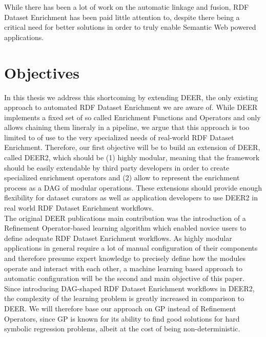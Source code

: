 While there has been a lot of work on the automatic linkage and fusion, \ac{RDF} Dataset Enrichment has been paid little attention to, despite there being a critical need for better solutions in order to truly enable  Semantic Web powered applications.

\section{Objectives}
\label{sec:objectives}
In this thesis we address this shortcoming by extending \ac{DEER}\cite{sherif:2015a}, the only existing approach to automated \ac{RDF} Dataset Enrichment we are aware of.
While DEER implements a fixed set of so called Enrichment Functions and Operators and only allows chaining them lineraly in a pipeline, we argue that this approach is too limited to of use to the very specialized needs of real-world \ac{RDF} Dataset Enrichment.
Therefore, our first objective will be to build an extension of \ac{DEER}, called \ac{DEER2}, which should be (1) highly modular, meaning that the framework should be easily extendable by third party developers in order to create specialized enrichment operators and (2) allow to represent the enrichment process as a \ac{DAG} of modular operations.
These extensions should provide enough flexibility for dataset curators as well as application developers to use \ac{DEER2} in real world \ac{RDF} Dataset Enrichment workflows.\\

The original \ac{DEER} publications main contribution was the introduction of a Refinement Operator-based learning algorithm which enabled novice users to define adequate \ac{RDF} Dataset Enrichment workflows.
As highly modular applications in general require a lot of manual configuration of their components and therefore presume expert knowledge to precisely define how the modules operate and interact with each other, a machine learning based approach to automatic configuration will be the second and main objective of this paper.\\

Since introducing \ac{DAG}-shaped \ac{RDF} Dataset Enrichment workflows in \ac{DEER2}, the complexity of the learning problem is greatly increased in comparison to \ac{DEER}.
We will therefore base our approach on \ac{GP} instead of Refinement Operators, since \ac{GP} is known for its ability to find good solutions for hard symbolic regression problems, albeit at the cost of being non-deterministic.

